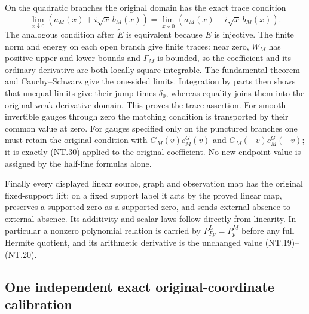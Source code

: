 On the quadratic branches the original domain has the exact trace
condition
\[
 \lim_{x\downarrow0}(a_M(x)+i\sqrt x\,b_M(x))
 =\lim_{x\downarrow0}(a_M(x)-i\sqrt x\,b_M(x)).
 \tag{NT.30}
\]
The analogous condition after $\widetilde E$ is equivalent because
$E$ is injective. The finite norm and energy on each open branch
give finite traces: near zero, $W_M$ has positive upper and lower
bounds and $\Gamma_M$ is bounded, so the coefficient and its
ordinary derivative are both locally square-integrable. The
fundamental theorem and Cauchy--Schwarz give the one-sided limits.
Integration by parts then shows that unequal limits give their
jump times $\delta_0$, whereas equality joins them into the
original weak-derivative domain. This proves the trace assertion.
For smooth invertible gauges through zero the matching condition
is transported by their common value at zero. For gauges specified
only on the punctured branches one must retain the original
condition with $G_M(v)c_M^G(v)$ and $G_M(-v)c_M^G(-v)$;
it is exactly (NT.30) applied to the original coefficient.
No new endpoint value is assigned by the half-line formulas alone.

Finally every displayed linear source, graph and observation map
has the original fixed-support lift: on a fixed support label it
acts by the proved linear map, preserves a supported zero as a
supported zero, and sends external absence to external absence.
Its additivity and scalar laws follow directly from linearity.
In particular a nonzero polynomial relation is carried by
$P^L_{Fp}=P^M_p$ before any full Hermite quotient, and its
arithmetic derivative is the unchanged value (NT.19)--(NT.20).

\subsection{One independent exact original-coordinate calibration}

